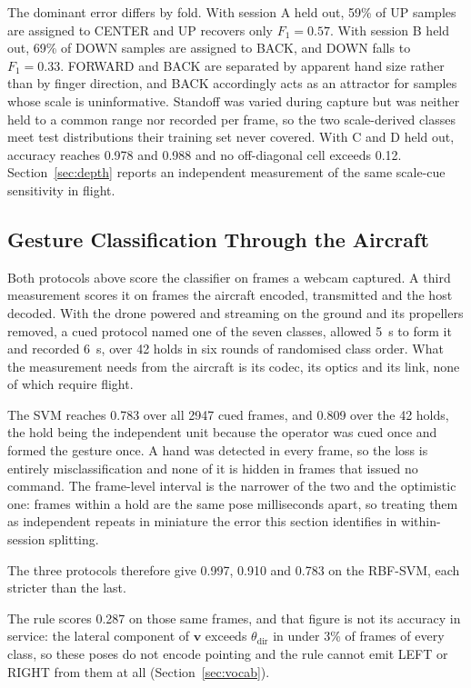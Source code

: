 \documentclass[conference]{IEEEtran}
\begin{document}
The dominant error differs by fold. With session A held out, 59\% of UP samples
are assigned to CENTER and UP recovers only $F_1=0.57$. With session B held out,
69\% of DOWN samples are assigned to BACK, and DOWN falls to $F_1=0.33$. FORWARD
and BACK are separated by apparent hand size rather than by finger direction,
and BACK accordingly acts as an attractor for samples whose scale is
uninformative. Standoff was varied during capture but was neither held to a
common range nor recorded per frame, so the two scale-derived classes meet test
distributions their training set never covered. With C and D held out, accuracy
reaches 0.978 and 0.988 and no off-diagonal cell exceeds 0.12.
Section~\ref{sec:depth} reports an independent measurement of the same
scale-cue sensitivity in flight.

\subsection{Gesture Classification Through the Aircraft}
\label{sec:opgesture}

Both protocols above score the classifier on frames a webcam captured. A third measurement scores it on frames the aircraft encoded,
transmitted and the host decoded. With the drone powered and streaming on the
ground and its propellers removed, a cued protocol named one of the seven classes,
allowed 5~s to form it and recorded 6~s, over 42 holds in six rounds of
randomised class order. What the measurement needs from the aircraft is its
codec, its optics and its link, none of which require flight.

The SVM reaches 0.783 over all 2947 cued frames, and 0.809 over the 42 holds,
the hold being the independent unit because the operator was cued once and
formed the gesture once. A hand was detected in every frame, so the loss is
entirely misclassification and none of it is hidden in frames that issued no
command. The frame-level interval is the narrower of the two and the optimistic
one: frames within a hold are the same pose milliseconds apart, so treating them
as independent repeats in miniature the error this section identifies in
within-session splitting.

The three protocols therefore give 0.997, 0.910 and 0.783 on the RBF-SVM, each
stricter than the last.

The rule scores 0.287 on those same frames, and that figure is not its accuracy
in service: the lateral component of $\mathbf{v}$ exceeds $\theta_{\mathrm{dir}}$
in under 3\% of frames of every class, so these poses do not encode pointing and
the rule cannot emit LEFT or RIGHT from them at all
(Section~\ref{sec:vocab}).
\end{document}
